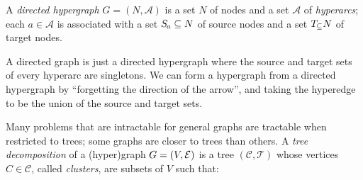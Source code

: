 \documentclass[twoside]{article}
\begin{document}
\begin{defn}
    A \emph{directed hypergraph} $G = (N, \mathcal A)$ is a set $N$ of
    nodes and a set $\mathcal A$ of \emph{hyperarcs}; each $a
    \in \mathcal A$  
    is associated with a set $\Src a \subseteq N$ of source nodes and a
    set $\Tgt \subseteq N$ of target nodes.  
\end{defn}
A directed graph is just a directed hypergraph where the source and target sets of every hyperarc are singletons. 
We can form a hypergraph from a directed hypergraph
by ``forgetting the direction of the arrow'', and taking the hyperedge
to be the union of the source and target sets. 

Many problems that are intractable for general graphs
are tractable when restricted to trees;
some graphs are closer to trees than others. 
%
A \emph{tree decomposition} of a (hyper)graph $G = (V, \mathcal E)$ is a tree
$(\mathcal C, \mathcal T)$ whose vertices $C \in \mathcal C$, called  
\emph{clusters}, are subsets of $V$ such that: 
\end{document}
